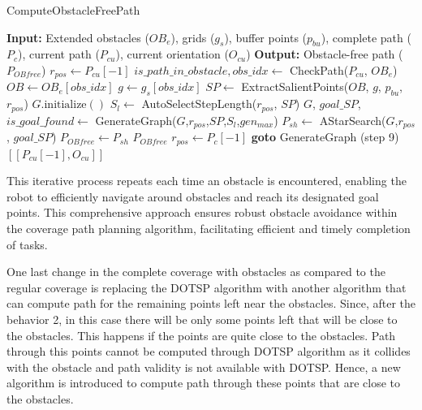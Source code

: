 \begin{algorithm}[H]
    \caption{ComputeObstacleFreePath}
    \label{alg:compute_obstacle_free_path}
    \begin{algorithmic}[1]
    \Statex \textbf{Input:} Extended obstacles ($OB_e$), grids ($g_s$), buffer points ($p_{bu}$), complete path ($P_c$), current path ($P_{cu}$), current orientation ($O_{cu}$)
    \Statex \textbf{Output:} Obstacle-free path ($P_{OB free}$)
    \newline
    \State $r_{pos} \leftarrow P_{cu}[-1]$
    \State $is\_path\_in\_obstacle, obs\_idx \leftarrow$ CheckPath($P_{cu}$, $OB_e$)
        \State $OB\leftarrow OB_e[obs\_idx]$
        \State $g \leftarrow g_s[obs\_idx]$
        \State $SP \leftarrow$ ExtractSalientPoints($OB$, $g$, $p_{bu}$, $r_{pos}$)
        \State $G.\text{initialize}()$
        \State $S_l \leftarrow$ AutoSelectStepLength($r_{pos}$, $SP$)
        \State $G$, $goal\_SP$, $is\_goal\_found \leftarrow$ GenerateGraph($G$,$r_{pos}$,$SP$,$S_l$,$gen_{max}$)
            \State $P_{sh} \leftarrow$ AStarSearch($G$,$r_{pos}$, $goal\_SP$)
            \State $P_{OB free} \leftarrow P_{sh}$
            \State \Return $P_{OB free}$
        \Else
            \State $r_{pos} \leftarrow P_c[-1]$ 
            \State \textbf{goto} GenerateGraph (step 9)
        \EndIf
    \Else
        \State \Return $[[P_{cu}[-1], O_{cu}]]$
    \EndIf
    \end{algorithmic}
    \end{algorithm}


This iterative process repeats each time an obstacle is encountered, enabling the robot to efficiently navigate around obstacles and reach its designated goal points. This comprehensive approach ensures robust obstacle avoidance within the coverage path planning algorithm, facilitating efficient and timely completion of tasks.

\vspace{3mm}  

One last change in the complete coverage with obstacles as compared to the regular coverage is replacing the DOTSP algorithm with another algorithm that can compute path for the remaining points left near the obstacles. Since, after the behavior 2, in this case there will be only some points left that will be close to the obstacles. This happens if the points are quite close to the obstacles. Path through this points cannot be computed through DOTSP algorithm as it collides with the obstacle and path validity is not available with DOTSP. Hence, a new algorithm is introduced to compute path through these points that are close to the obstacles.  


